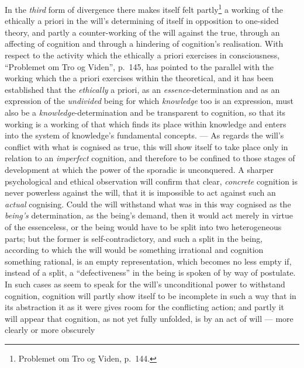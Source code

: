 \documentclass[12pt,a4paper]{book}
\begin{document}
In the \emph{third} form of divergence there makes itself felt partly\footnote{Problemet
om Tro og Viden, p.\ 144.} a working of the ethically a priori in the will's
determining of itself in opposition to one-sided theory, and partly a
counter-working of the will against the true, through an affecting of
cognition and through a hindering of cognition's realisation. With respect to
the activity which the ethically a priori exercises in consciousness,
``Problemet om Tro og Viden'', p.\ 145, has pointed to the parallel with the
working which the a priori exercises within the theoretical, and it has been
established that the \emph{ethically} a priori, as an \emph{essence}-determination
and as an expression of the \emph{undivided} being for which \emph{knowledge}
too is an expression, must also be a \emph{knowledge}-determination and be
transparent to cognition, so that its
working is a working of that which finds its place within knowledge and enters
into the system of knowledge's fundamental concepts. --- As regards the will's
conflict with what is cognised as true, this will show itself to take place
only in relation to an \emph{imperfect} cognition, and therefore to be
confined to those stages of development at which the power of the sporadic is
unconquered. A sharper psychological and ethical observation will confirm that
clear, \emph{concrete} cognition is never powerless against the will, that it
is impossible to act against
such an \emph{actual} cognising. Could the will withstand what was in this way
cognised as the \emph{being's} determination, as the being's demand, then it
would act merely in virtue of the essenceless, or the being would have to be
split into two heterogeneous parts; but the former is self-contradictory, and
such a split in the being, according to which the will would be something
irrational and cognition something rational, is an empty representation, which
becomes no less empty if, instead of a split, a ``defectiveness'' in the being
is spoken of by way of postulate. In such cases as seem to speak for the will's
unconditional power to withstand cognition, cognition will partly show itself
to be incomplete in such a way that in its abstraction it as it were gives
room for the conflicting action; and partly it will appear that cognition, as
not yet fully unfolded, is by an act of will --- more clearly or more obscurely
\end{document}
